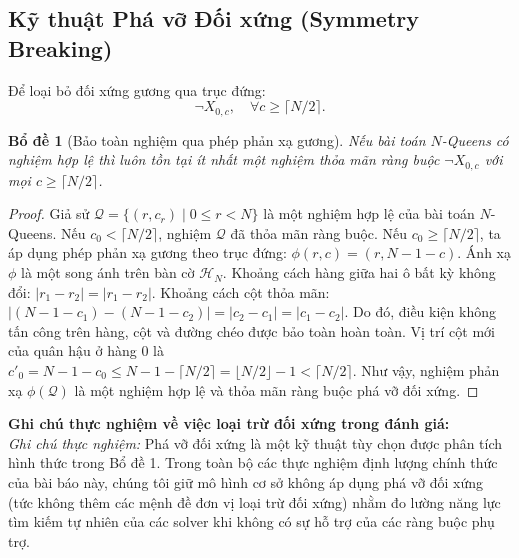 \documentclass[11pt,a4paper]{article}
\newtheorem{lemma}{Bổ đề}
\begin{document}
\subsection{Kỹ thuật Phá vỡ Đối xứng (Symmetry Breaking)}
Để loại bỏ đối xứng gương qua trục đứng:
\begin{equation}
    \neg X_{0, c}, \quad \forall c \ge \lceil N / 2 \rceil.
\end{equation}

\begin{lemma}[Bảo toàn nghiệm qua phép phản xạ gương]
Nếu bài toán $N$-Queens có nghiệm hợp lệ thì luôn tồn tại ít nhất một nghiệm thỏa mãn ràng buộc $\neg X_{0, c}$ với mọi $c \ge \lceil N/2 \rceil$.
\end{lemma}
\begin{proof}
Giả sử $\mathcal{Q} = \{(r, c_r) \mid 0 \le r < N\}$ là một nghiệm hợp lệ của bài toán $N$-Queens. Nếu $c_0 < \lceil N/2 \rceil$, nghiệm $\mathcal{Q}$ đã thỏa mãn ràng buộc. Nếu $c_0 \ge \lceil N/2 \rceil$, ta áp dụng phép phản xạ gương theo trục đứng: $\phi(r, c) = (r, N - 1 - c)$. Ánh xạ $\phi$ là một song ánh trên bàn cờ $\mathcal{H}_N$. Khoảng cách hàng giữa hai ô bất kỳ không đổi: $|r_1 - r_2| = |r_1 - r_2|$. Khoảng cách cột thỏa mãn: $|(N - 1 - c_1) - (N - 1 - c_2)| = |c_2 - c_1| = |c_1 - c_2|$. Do đó, điều kiện không tấn công trên hàng, cột và đường chéo được bảo toàn hoàn toàn. Vị trí cột mới của quân hậu ở hàng 0 là $c'_0 = N - 1 - c_0 \le N - 1 - \lceil N/2 \rceil = \lfloor N/2 \rfloor - 1 < \lceil N/2 \rceil$. Như vậy, nghiệm phản xạ $\phi(\mathcal{Q})$ là một nghiệm hợp lệ và thỏa mãn ràng buộc phá vỡ đối xứng.
\end{proof}

\noindent\textbf{Ghi chú thực nghiệm về việc loại trừ đối xứng trong đánh giá:}\\
\textit{Ghi chú thực nghiệm:} Phá vỡ đối xứng là một kỹ thuật tùy chọn được phân tích hình thức trong Bổ đề 1. Trong toàn bộ các thực nghiệm định lượng chính thức của bài báo này, chúng tôi giữ mô hình cơ sở không áp dụng phá vỡ đối xứng (tức không thêm các mệnh đề đơn vị loại trừ đối xứng) nhằm đo lường năng lực tìm kiếm tự nhiên của các solver khi không có sự hỗ trợ của các ràng buộc phụ trợ.
\end{document}
